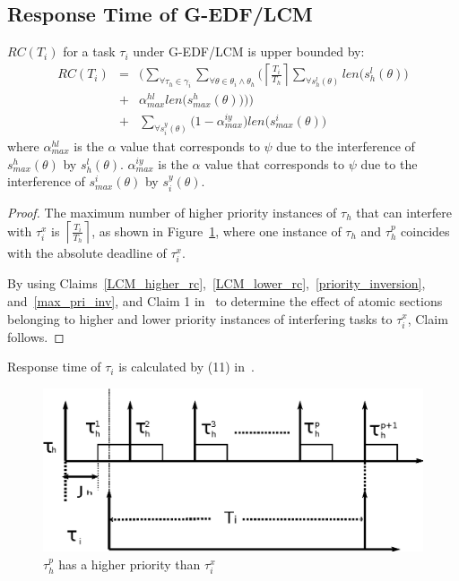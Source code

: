 \subsection{\label{response g-edf/lcm} Response Time of G-EDF/LCM}


\begin{clm}\label{GEDF/LCM response time}
$RC(T_i)$ for a task $\tau_i$ under G-EDF/LCM is upper bounded by:
\begin{eqnarray}
RC(T_i) & = & \Bigg(\sum_{\forall \tau_h \in \gamma_i}\sum_{\forall\theta \in \theta_i \wedge \theta_h}\Bigg(\left\lceil\frac{T_{i}}{T_{h}}\right\rceil\sum_{\forall s_{h}^{l}(\theta)}len\Big(s_{h}^{l}(\theta)\Big)\nonumber\\
& + & \alpha_{max}^{hl}len\Big(s_{max}^{h}(\theta)\Big)\Bigg)\Bigg)\nonumber\\
& + & \sum_{\forall s_{i}^{y}(\theta)}\Big(1-\alpha_{max}^{iy}\Big)len\Big(s_{max}^i(\theta)\Big)  
\label{eq78}\end{eqnarray} 
where $\alpha_{max}^{hl}$ is the $\alpha$ value that corresponds to $\psi$ due to the interference of $s_{max}^h(\theta)$ by $s_h^l(\theta)$. $\alpha_{max}^{iy}$ is the $\alpha$ value that corresponds to $\psi$ due to the interference of $s_{max}^i(\theta)$ by $s_i^y(\theta)$.
\end{clm}

\begin{proof}
The maximum number of higher priority instances of $\tau_h$ that can interfere with $\tau_i^x$ is $\left\lceil\frac{T_i}{T_h}\right\rceil$, as shown in Figure~\ref{fig17}, where one instance of $\tau_h$ and $\tau_h^p$ coincides with the absolute deadline of $\tau_i^x$.

By using Claims~\ref{LCM_higher_rc},~\ref{LCM_lower_rc},~\ref{priority_inversion}, and~\ref{max_pri_inv}, and Claim 1 in~\cite{stmconcurrencycontrol:emsoft11} to determine the effect of atomic sections belonging to higher and lower priority instances of interfering tasks to $\tau_i^x$, Claim follows.
\end{proof}


Response time of $\tau_{i}$ is calculated by (11) in~\cite{stmconcurrencycontrol:emsoft11}.
\begin{figure}
\begin{centering}
\includegraphics[scale=0.6]{figures/figure18}
\par\end{centering}
\caption{\label{fig17}$\tau_h^p$ has a higher priority than $\tau_i^x$}
\end{figure}

